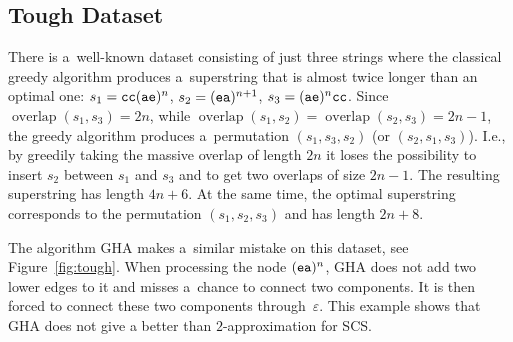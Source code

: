 \documentclass[11pt]{article}
\DeclareMathOperator{\overlap}{overlap}
\newenvironment{mypic}{\begin{center}\begin{tikzpicture}[>=latex,line width=.3mm]}{\end{tikzpicture}\end{center}}
\begin{document}
\subsection{Tough Dataset}
There is a~well-known dataset consisting of just three strings where the classical greedy algorithm produces a~superstring that is almost twice longer than an optimal one: $s_1={\tt cc}({\tt ae})^n$, $s_2=({\tt ea})^{n+1}$, $s_3=({\tt ae})^n{\tt cc}$. Since $\overlap(s_1, s_3)=2n$,
 while $\overlap(s_1,s_2)=\overlap(s_2,s_3)=2n-1$, the greedy algorithm produces a~permutation $(s_1, s_3, s_2)$ (or $(s_2,s_1,s_3)$). I.e., by greedily taking the massive overlap of length $2n$ it loses the possibility to insert $s_2$ between $s_1$ and $s_3$ and to get two overlaps of size $2n-1$. The resulting superstring has length $4n+6$. At the same time, the optimal superstring corresponds to the permutation $(s_1,s_2,s_3)$ and has length $2n+8$.
 
The algorithm GHA makes a~similar mistake on this dataset, see Figure~\ref{fig:tough}. When processing the node $({\tt ea})^n$, GHA does not add two lower edges to it and misses a~chance to connect two components. It is then forced to connect these two components through~$\varepsilon$. This example shows that GHA does not give a better than $2$-approximation for SCS.

%
%
% 
%
\end{document}
